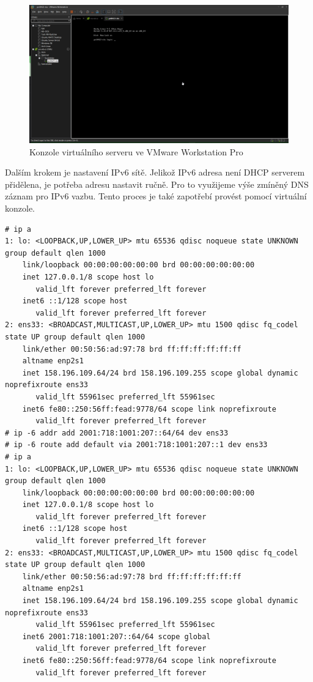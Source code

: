 \begin{figure}
    \centering
    \includegraphics[width=0.75\linewidth]{Figures/vmware_console.png}
    \caption{Konzole virtuálního serveru ve VMware Workstation Pro}
    \label{fig:vmware-workstation-pro}
\end{figure}

Dalším krokem je nastavení IPv6 sítě. Jelikož IPv6 adresa není
DHCP serverem přidělena, je potřeba adresu nastavit ručně. Pro to
využijeme výše zmíněný DNS záznam pro IPv6 vazbu. Tento proces
je také zapotřebí provést pomocí virtuální konzole.

\begin{verbatim}
# ip a
1: lo: <LOOPBACK,UP,LOWER_UP> mtu 65536 qdisc noqueue state UNKNOWN
group default qlen 1000
    link/loopback 00:00:00:00:00:00 brd 00:00:00:00:00:00
    inet 127.0.0.1/8 scope host lo
       valid_lft forever preferred_lft forever
    inet6 ::1/128 scope host
       valid_lft forever preferred_lft forever
2: ens33: <BROADCAST,MULTICAST,UP,LOWER_UP> mtu 1500 qdisc fq_codel
state UP group default qlen 1000
    link/ether 00:50:56:ad:97:78 brd ff:ff:ff:ff:ff:ff
    altname enp2s1
    inet 158.196.109.64/24 brd 158.196.109.255 scope global dynamic
noprefixroute ens33
       valid_lft 55961sec preferred_lft 55961sec
    inet6 fe80::250:56ff:fead:9778/64 scope link noprefixroute
       valid_lft forever preferred_lft forever
# ip -6 addr add 2001:718:1001:207::64/64 dev ens33
# ip -6 route add default via 2001:718:1001:207::1 dev ens33
# ip a
1: lo: <LOOPBACK,UP,LOWER_UP> mtu 65536 qdisc noqueue state UNKNOWN
group default qlen 1000
    link/loopback 00:00:00:00:00:00 brd 00:00:00:00:00:00
    inet 127.0.0.1/8 scope host lo
       valid_lft forever preferred_lft forever
    inet6 ::1/128 scope host
       valid_lft forever preferred_lft forever
2: ens33: <BROADCAST,MULTICAST,UP,LOWER_UP> mtu 1500 qdisc fq_codel
state UP group default qlen 1000
    link/ether 00:50:56:ad:97:78 brd ff:ff:ff:ff:ff:ff
    altname enp2s1
    inet 158.196.109.64/24 brd 158.196.109.255 scope global dynamic
noprefixroute ens33
       valid_lft 55961sec preferred_lft 55961sec
    inet6 2001:718:1001:207::64/64 scope global
       valid_lft forever preferred_lft forever
    inet6 fe80::250:56ff:fead:9778/64 scope link noprefixroute
       valid_lft forever preferred_lft forever
\end{verbatim}

